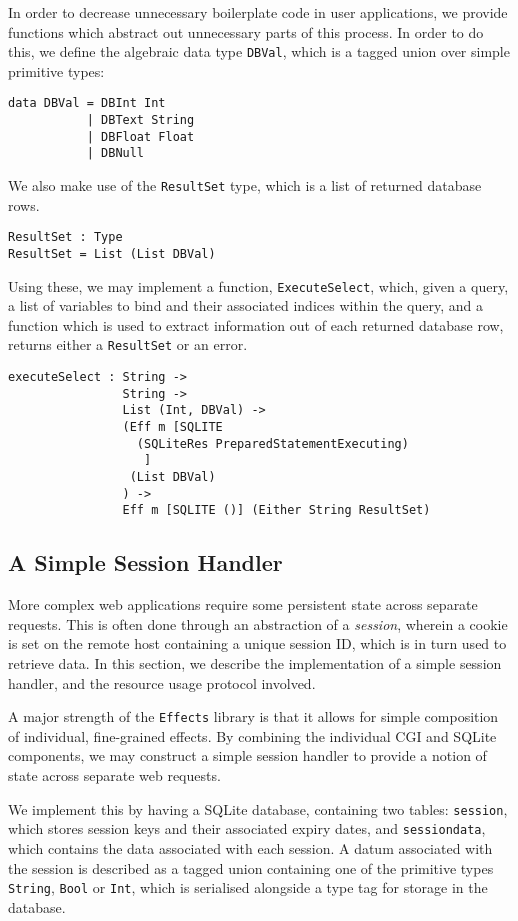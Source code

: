 \documentclass[preprint]{sigplanconf}
\begin{document}
In order to decrease unnecessary boilerplate code in user applications, we provide functions which abstract out unnecessary parts of this process. In order to do this, we define the algebraic data type \texttt{DBVal}, which is a tagged union over simple primitive types:
{\small
\begin{verbatim}
data DBVal = DBInt Int
           | DBText String
           | DBFloat Float
           | DBNull
\end{verbatim}
}
We also make use of the \texttt{ResultSet} type, which is a list of returned database rows.
\begin{verbatim}
ResultSet : Type
ResultSet = List (List DBVal)
\end{verbatim}
Using these, we may implement a function, \texttt{ExecuteSelect}, which, given a query, a list of variables to bind and their associated indices within the query, and a function which is used to extract information out of each returned database row, returns either a \texttt{ResultSet} or an error.
{\small
\begin{verbatim}
executeSelect : String ->
                String -> 
                List (Int, DBVal) -> 
                (Eff m [SQLITE 
                  (SQLiteRes PreparedStatementExecuting)
                   ] 
                 (List DBVal)
                ) -> 
                Eff m [SQLITE ()] (Either String ResultSet)
\end{verbatim}
}

\subsection{A Simple Session Handler}
More complex web applications require some persistent state across separate requests. This is often done through an abstraction of a \textit{session}, wherein a cookie is set on the remote host containing a unique session ID, which is in turn used to retrieve data. In this section, we describe the implementation of a simple session handler, and the resource usage protocol involved. 

A major strength of the \texttt{Effects} library is that it allows for simple composition of individual, fine-grained effects. By combining the individual CGI and SQLite components, we may construct a simple session handler to provide a notion of state across separate web requests. 

We implement this by having a SQLite database, containing two tables: \texttt{session}, which stores session keys and their associated expiry dates, and \texttt{sessiondata}, which contains the data associated with each session. A datum associated with the session is described as a tagged union containing one of the primitive types \texttt{String}, \texttt{Bool} or \texttt{Int}, which is serialised alongside a type tag for storage in the database.
\end{document}

